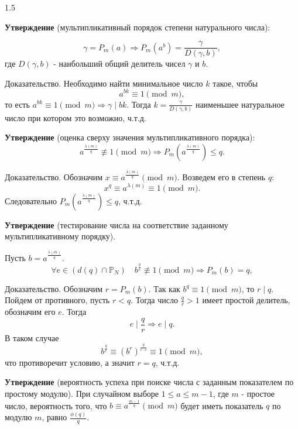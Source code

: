 \documentclass[14pt,a4paper]{extarticle}
\begin{document}
\begin{spacing}{1.5}
\vspace{1cm}

\noindent \textbf{Утверждение} (мультипликативный порядок степени натурального числа):

\[
    \gamma = P_m(a) \Rightarrow P_m(a^b) = \frac{\gamma}{D(\gamma, b)},
\]
где \(D(\gamma, b)\) - наибольший общий делитель чисел \(\gamma\) и \(b\).

\noindent Доказательство.
Необходимо найти минимальное число \(k\) такое, чтобы
\[
    a^{bk} \equiv 1 \pmod m,
\]
то есть \(a^{bk} \equiv 1 \pmod m \Rightarrow \gamma \mid bk\). Тогда \(k = \frac{\gamma}{D(\gamma, b)}\) наименьшее натуральное число при котором это возможно, ч.т.д.

\vspace{1cm}

\noindent \textbf{Утверждение} (оценка сверху значения мультипликативного порядка):
\[
    a^{\frac{\lambda(m)}{q}} \not\equiv 1 \pmod m \Rightarrow P_m(a^{\frac{\lambda(m)}{q}}) \le q.
\]

\noindent Доказательство.
Обозначим \(x \equiv a^{\frac{\lambda(m)}{q}} \pmod m\). Возведем его в степень \(q\):
\[
    x^q \equiv a^{\lambda(m)} \equiv 1 \pmod m.
\]
Следовательно \(P_m(a^{\frac{\lambda(m)}{q}}) \le q\), ч.т.д.

\vspace{1cm}

\noindent \textbf{Утверждение} (тестирование числа на соответствие заданному мультипликативному порядку).

\noindent Пусть \(b = a^{\frac{\lambda(m)}{q}}\).
\[
    \forall e \in (d(q) \cap \mathbb{P}_N) \quad b^{\frac{q}{e}} \not\equiv 1 \pmod m \Rightarrow P_m(b) = q,
\]

\noindent Доказательство.
Обозначим \(r = P_m(b)\). Так как \(b^q \equiv 1 \pmod m\), то \(r \mid q\).
Пойдем от противного, пусть \(r < q\). Тогда число \(\frac{q}{r} > 1\) имеет простой делитель, обозначим его \(e\). Тогда
\[
    e \mid \frac{q}{r} \Rightarrow e \mid q.
\]
В таком случае
\[
    b^{\frac{q}{e}} \equiv (b^r)^{\frac{q}{r \cdot e}} \equiv 1 \pmod m,
\]
что противоречит условию, а значит \(r = q\), ч.т.д.

\vspace{1cm}

\noindent \textbf{Утверждение} (вероятность успеха при поиске числа с заданным показателем по простому модулю). При случайном выборе \(1 \le a \le m - 1\), где \(m\) - простое число, вероятность того, что \(b \equiv a^{\frac{m-1}{q}} \pmod m\) будет иметь показатель \(q\) по модулю \(m\), равно \(\frac{\phi(q)}{q}\).


\end{spacing}
\end{document}
